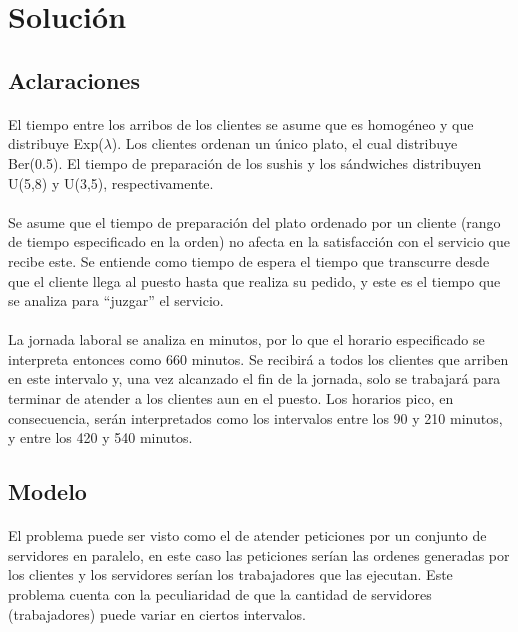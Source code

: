 \documentclass{article}
\begin{document}
\section {Solución}
\subsection {Aclaraciones}
\paragraph{}
El tiempo entre los arribos de los clientes se asume que es homogéneo y que distribuye Exp($\lambda$). Los clientes ordenan 
un único plato, el cual distribuye Ber(0.5). El tiempo de preparación de los sushis y los sándwiches distribuyen 
U(5,8) y U(3,5), respectivamente.
\paragraph{}
Se asume que el tiempo de preparación del plato ordenado por un cliente (rango de tiempo especificado en la orden) 
no afecta en la satisfacción con el servicio que recibe este. Se entiende como tiempo de espera el tiempo que 
transcurre desde que el cliente llega al puesto hasta que realiza su pedido, y este es el tiempo que se analiza 
para “juzgar” el servicio.
\paragraph{}
La jornada laboral se analiza en minutos, por lo que el horario especificado se interpreta entonces como 660 minutos. 
Se recibirá a todos los clientes que arriben en este intervalo y, una vez alcanzado el fin de la jornada, solo se 
trabajará para terminar de atender a los clientes aun en el puesto. Los horarios pico, en consecuencia, serán 
interpretados como los intervalos entre los 90 y 210 minutos, y entre los 420 y 540 minutos.

\subsection {Modelo}
\paragraph{}
El problema puede ser visto como el de atender peticiones por un conjunto de servidores en paralelo, en este caso las 
peticiones serían las ordenes generadas por los clientes y los servidores serían los trabajadores que las ejecutan. Este 
problema cuenta con la peculiaridad de que la cantidad de servidores (trabajadores) puede variar en ciertos intervalos.
\end{document}
